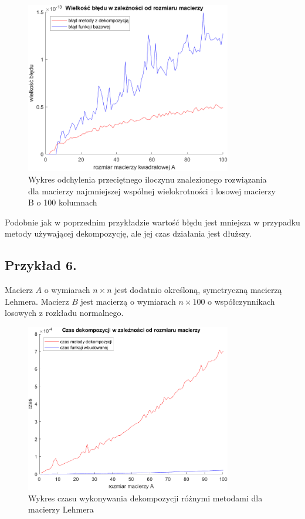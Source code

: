 \documentclass{article}
\begin{document}
\begin{figure}[!ht]
\centering
  \centering
  \includegraphics[width=9cm]{wykresy/przyklad5.png}
  \caption{Wykres odchylenia przeciętnego iloczynu znalezionego rozwiązania \\
  dla macierzy najmniejszej wspólnej wielokrotności i losowej macierzy B o 100 kolumnach}
  \label{fig:sub1}
\label{fig:test}
\end{figure}

Podobnie jak w poprzednim przykładzie wartość błędu jest mniejsza w przypadku metody używającej dekompozycję, ale jej czas działania jest dłuższy.

\newpage

\subsection*{Przykład 6.}

Macierz $A$ o wymiarach $n \times n$ jest dodatnio określoną, symetryczną macierzą Lehmera. Macierz $B$ jest macierzą o wymiarach $n \times 100$ o współczynnikach losowych z rozkładu normalnego.



\begin{figure}[htp]
\centering
  \centering
  \includegraphics[width=9cm]{wykresy/przyklad6_1.png}
  \caption{Wykres czasu wykonywania dekompozycji różnymi metodami dla macierzy Lehmera}
  \label{fig:sub1}
\label{fig:test}
\end{figure}
\end{document}
